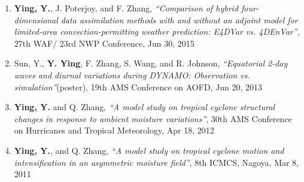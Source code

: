 \begin{enumerate}
\item \textbf{Ying, Y.}, J. Poterjoy, and F. Zhang,
\textit{``Comparison of hybrid four-dimensional data assimilation methods with and without an adjoint model for limited-area convection-permitting weather prediction: E4DVar vs. 4DEnVar''},
27th WAF/ 23rd NWP Conference, Jun 30, 2015

\item Sun, Y., \textbf{Y. Ying}, F. Zhang, S. Wang, and R. Johnson,
\textit{``Equatorial 2-day waves and diurnal variations during DYNAMO: Observation vs. simulation''}(poster),
19th AMS Conference on AOFD, Jun 20, 2013

\item \textbf{Ying, Y.} and Q. Zhang,
\textit{``A model study on tropical cyclone structural changes in response to ambient moisture variations''},
30th AMS Conference on Hurricanes and Tropical Meteorology, Apr 18, 2012

\item \textbf{Ying, Y.}, and Q. Zhang,
\textit{``A model study on tropical cyclone motion and intensification in an asymmetric moisture field''},
8th ICMCS, Nagoya, Mar 8, 2011

\end{enumerate}
